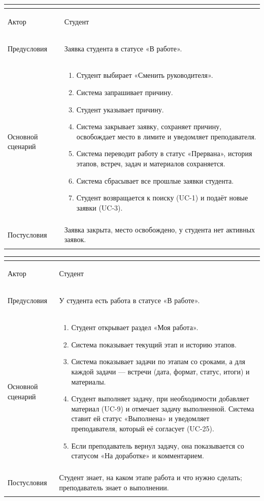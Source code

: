 \documentclass[a4paper,12pt]{article}
\newenvironment{ucd}[3]{%
  \needspace{10\baselineskip}
  \begin{longtable}{|>{\bfseries\raggedright\arraybackslash}p{3.0cm}|p{11.8cm}|}
  \hline
  \multicolumn{2}{|l|}{\textbf{#1.\ #2}}\\ \hline
  Актор & #3\\ \hline
}{\end{longtable}}
\newcommand{\steps}[1]{\begin{enumerate}[nosep,leftmargin=*]#1\end{enumerate}}
\begin{document}
\begin{ucd}{UC-7}{Сменить научного руководителя}{Студент}
Предусловия & Заявка студента в статусе «В работе».\\ \hline
Основной сценарий & \steps{
 \item Студент выбирает «Сменить руководителя».
 \item Система запрашивает причину.
 \item Студент указывает причину.
 \item Система закрывает заявку, сохраняет причину, освобождает место в лимите и уведомляет преподавателя.
 \item Система переводит работу в статус «Прервана», история этапов, встреч, задач и материалов сохраняется.
 \item Система сбрасывает все прошлые заявки студента.
 \item Студент возвращается к поиску (UC-1) и подаёт новые заявки (UC-3).}\\ \hline
Постусловия & Заявка закрыта, место освобождено, у студента нет активных заявок.\\ \hline
\end{ucd}

\begin{ucd}{UC-8}{Посмотреть этап, встречи и задачи своей работы и отметить задачу выполненной}{Студент}
Предусловия & У студента есть работа в статусе «В работе».\\ \hline
Основной сценарий & \steps{
 \item Студент открывает раздел «Моя работа».
 \item Система показывает текущий этап и историю этапов.
 \item Система показывает задачи по этапам со сроками, а для каждой задачи — встречи (дата, формат, статус, итоги) и материалы.
 \item Студент выполняет задачу, при необходимости добавляет материал (UC-9) и отмечает задачу выполненной. Система ставит ей статус «Выполнена» и уведомляет преподавателя, который её согласует (UC-25).
 \item Если преподаватель вернул задачу, она показывается со статусом «На доработке» и комментарием.}\\ \hline
Постусловия & Студент знает, на каком этапе работа и что нужно сделать; преподаватель знает о выполнении.\\ \hline
\end{ucd}
\end{document}
